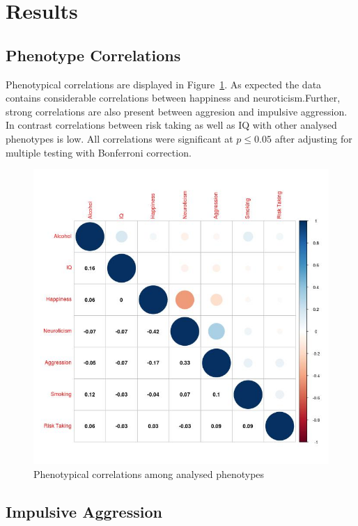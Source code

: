 \section{Results}
\label{sec:results_ukb_assoc}

\subsection{Phenotype Correlations}
\label{sub:phenotype_correlations}

Phenotypical correlations are displayed in Figure~\ref{fig:corr_pheno}. 
As expected the data contains considerable correlations between happiness and neuroticism.Further, strong correlations are also present between aggresion and impulsive aggression.
In contrast correlations between risk taking as well as IQ with other analysed phenotypes is low.
All correlations were significant at $p\leq 0.05$ after adjusting for multiple testing  with Bonferroni correction.

\begin{figure}[htpb]
  \centering
  \includegraphics[width=0.8\linewidth]{ukb_assoc/figure/phenotype/corr_plot_circle_full.jpeg}
  \caption{Phenotypical correlations among analysed phenotypes}\label{fig:corr_pheno}
\end{figure}


\subsection{Impulsive Aggression}
\label{sub:impulsive_aggression_gwas}

